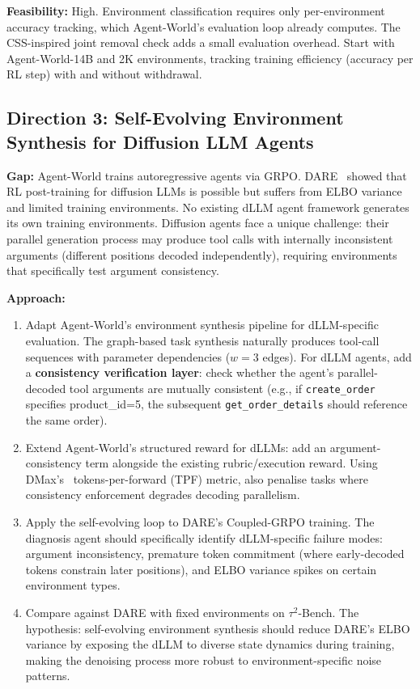 \documentclass[11pt]{article}
\begin{document}
\textbf{Feasibility:} High. Environment classification requires only per-environment accuracy tracking, which Agent-World's evaluation loop already computes. The CSS-inspired joint removal check adds a small evaluation overhead. Start with Agent-World-14B and 2K environments, tracking training efficiency (accuracy per RL step) with and without withdrawal.

\subsection{Direction 3: Self-Evolving Environment Synthesis for Diffusion LLM Agents}

\textbf{Gap:} Agent-World trains autoregressive agents via GRPO. DARE~\cite{dare} showed that RL post-training for diffusion LLMs is possible but suffers from ELBO variance and limited training environments. No existing dLLM agent framework generates its own training environments. Diffusion agents face a unique challenge: their parallel generation process may produce tool calls with internally inconsistent arguments (different positions decoded independently), requiring environments that specifically test argument consistency.

\textbf{Approach:}
\begin{enumerate}
    \item Adapt Agent-World's environment synthesis pipeline for dLLM-specific evaluation. The graph-based task synthesis naturally produces tool-call sequences with parameter dependencies ($w = 3$ edges). For dLLM agents, add a \textbf{consistency verification layer}: check whether the agent's parallel-decoded tool arguments are mutually consistent (e.g., if \texttt{create\_order} specifies product\_id=5, the subsequent \texttt{get\_order\_details} should reference the same order).

    \item Extend Agent-World's structured reward for dLLMs: add an argument-consistency term alongside the existing rubric/execution reward. Using DMax's~\cite{dmax} tokens-per-forward (TPF) metric, also penalise tasks where consistency enforcement degrades decoding parallelism.

    \item Apply the self-evolving loop to DARE's Coupled-GRPO training. The diagnosis agent should specifically identify dLLM-specific failure modes: argument inconsistency, premature token commitment (where early-decoded tokens constrain later positions), and ELBO variance spikes on certain environment types.

    \item Compare against DARE with fixed environments on $\tau^2$-Bench. The hypothesis: self-evolving environment synthesis should reduce DARE's ELBO variance by exposing the dLLM to diverse state dynamics during training, making the denoising process more robust to environment-specific noise patterns.
\end{enumerate}
\end{document}
